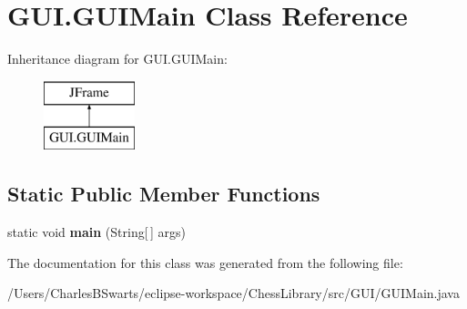 \hypertarget{class_g_u_i_1_1_g_u_i_main}{}\section{G\+U\+I.\+G\+U\+I\+Main Class Reference}
\label{class_g_u_i_1_1_g_u_i_main}
Inheritance diagram for G\+U\+I.\+G\+U\+I\+Main\+:\begin{figure}[H]
\begin{center}
\leavevmode
\includegraphics[height=2.000000cm]{class_g_u_i_1_1_g_u_i_main}
\end{center}
\end{figure}
\subsection*{Static Public Member Functions}
\begin{DoxyCompactItemize}
\item 
\mbox{\label{class_g_u_i_1_1_g_u_i_main_aa7064fd358c4134460d9974c363674b5}} 
static void {\bfseries main} (String\mbox{[}$\,$\mbox{]} args)
\end{DoxyCompactItemize}


The documentation for this class was generated from the following file\+:\begin{DoxyCompactItemize}
\item 
/\+Users/\+Charles\+B\+Swarts/eclipse-\/workspace/\+Chess\+Library/src/\+G\+U\+I/G\+U\+I\+Main.\+java\end{DoxyCompactItemize}
